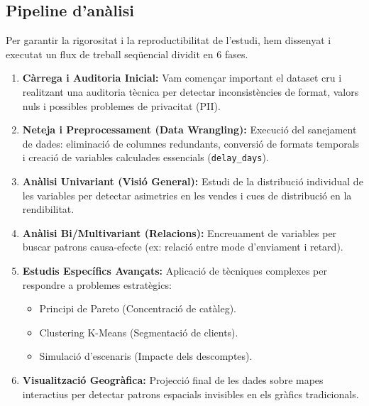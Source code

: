 \documentclass[12pt,a4paper]{article}
\begin{document}
\newpage  
\newpage
\subsection{Pipeline d'anàlisi}
Per garantir la rigorositat i la reproductibilitat de l'estudi, hem dissenyat i executat un flux de treball seqüencial dividit en 6 fases.

\begin{enumerate}
    \item \textbf{Càrrega i Auditoria Inicial:}
    Vam començar important el dataset cru i realitzant una auditoria tècnica per detectar inconsistències de format, valors nuls i possibles problemes de privacitat (PII).
    
    \item \textbf{Neteja i Preprocessament (Data Wrangling):}
    Execució del sanejament de dades: eliminació de columnes redundants, conversió de formats temporals i creació de variables calculades essencials (\texttt{delay\_days}).
    
    
    \item \textbf{Anàlisi Univariant (Visió General):}
    Estudi de la distribució individual de les variables per detectar asimetries en les vendes i cues de distribució en la rendibilitat.
    
    \item \textbf{Anàlisi Bi/Multivariant (Relacions):}
    Encreuament de variables per buscar patrons causa-efecte (ex: relació entre mode d'enviament i retard).
    
    \item \textbf{Estudis Específics Avançats:}
    Aplicació de tècniques complexes per respondre a problemes estratègics:
    \begin{itemize}
        \item Principi de Pareto (Concentració de catàleg).
        \item Clustering K-Means (Segmentació de clients).
        \item Simulació d'escenaris (Impacte dels descomptes).
    \end{itemize}
    
    \item \textbf{Visualització Geogràfica:}
    Projecció final de les dades sobre mapes interactius per detectar patrons espacials invisibles en els gràfics tradicionals.
\end{enumerate}
\newpage
\end{document}
